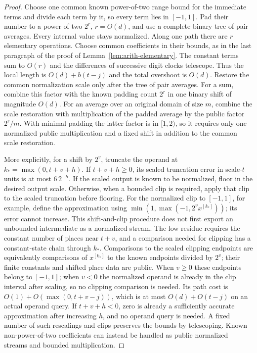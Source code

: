 \documentclass[11pt]{article}
\numberwithin{equation}{section}
\theoremstyle{definition}
\theoremstyle{remark}
\begin{document}
\begin{proof}
Choose one common known power-of-two range bound for the immediate
terms and divide each term by it, so every term lies in $[-1,1]$.
Pad their number to a power of two $2^r$, $r=O(d)$, and use a complete
binary tree of pair averages.  Every internal value stays normalized.
Along one path there are $r$ elementary operations.  Choose common
coefficients in their bounds, as in the last paragraph of the
proof of Lemma~\ref{lem:arith-elementary}.  The constant terms
sum to $O(r)$ and the differences of successive digit clocks
telescope.  Thus the local length is $O(d)+b(t-j)$ and the
total overshoot is $O(d)$.  Restore the common normalization scale
only after the tree of pair averages.  For a sum, combine this factor
with the known padding count $2^r$ in one binary shift of magnitude
$O(d)$.  For an average over an original domain of size $m$, combine
the scale restoration with multiplication of the padded average by
the public factor $2^r/m$.  With minimal padding the latter factor
is in $[1,2)$, so it requires only one normalized public multiplication
and a fixed shift in addition to the common scale restoration.

More explicitly, for a shift by $2^v$, truncate the operand at
${k_*}=\max(0,t+v+h)$.  If $t+v+h\geq0$, its scaled truncation
error in scale-$t$ units is at most $6\,2^{-h}$.  If the scaled
output is known to be normalized, floor in the desired output
scale.  Otherwise, when a bounded clip is required, apply that
clip to the scaled truncation before flooring.  For the
normalized clip to $[-1,1]$, for example, define the approximation
using $\min(1,\max(-1,2^v x^{[{k_*}]}))$; its error cannot increase.
This shift-and-clip procedure does not first export an unbounded
intermediate as a normalized stream.
The low residue requires the constant number of places near
$t+v$, and a comparison needed for clipping has a constant-state
chain through ${k_*}$.  Comparisons to the scaled clipping endpoints
are equivalently comparisons of $x^{[{k_*}]}$ to the known endpoints
divided by $2^v$; their finite constants and shifted place data
are public.  When $v\geq0$ these endpoints belong to $[-1,1]$;
when $v<0$ the normalized operand is already in the clip interval
after scaling, so no clipping comparison is needed.  Its path cost is
$O(1)+O(\max(0,t+v-j))$, which is at most
$O(d)+O(t-j)$ on an actual operand query.  If $t+v+h<0$, zero
is already a sufficiently accurate approximation after increasing
$h$, and no operand query is needed.  A fixed number of such
rescalings and clips preserves the bounds by telescoping.
Known non-power-of-two coefficients can instead be handled as
public normalized streams and bounded multiplication.
\end{proof}
\end{document}

